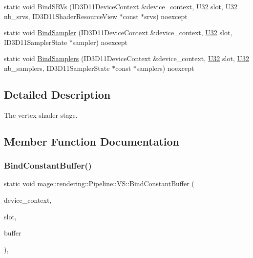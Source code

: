 \begin{DoxyCompactItemize}
\item 
static void \mbox{\hyperlink{structmage_1_1rendering_1_1_pipeline_1_1_v_s_a3285afafbc6c26d5677f010f793aa153}{Bind\+S\+R\+Vs}} (I\+D3\+D11\+Device\+Context \&device\+\_\+context, \mbox{\hyperlink{namespacemage_aa5d6eaabaac3cdd01873d6a3d27e90f3}{U32}} slot, \mbox{\hyperlink{namespacemage_aa5d6eaabaac3cdd01873d6a3d27e90f3}{U32}} nb\+\_\+srvs, I\+D3\+D11\+Shader\+Resource\+View $\ast$const $\ast$srvs) noexcept
\item 
static void \mbox{\hyperlink{structmage_1_1rendering_1_1_pipeline_1_1_v_s_a70bfab85f76020ee3562a470cd70f728}{Bind\+Sampler}} (I\+D3\+D11\+Device\+Context \&device\+\_\+context, \mbox{\hyperlink{namespacemage_aa5d6eaabaac3cdd01873d6a3d27e90f3}{U32}} slot, I\+D3\+D11\+Sampler\+State $\ast$sampler) noexcept
\item 
static void \mbox{\hyperlink{structmage_1_1rendering_1_1_pipeline_1_1_v_s_a154f65e40cf64e1b1f680aa1f8471142}{Bind\+Samplers}} (I\+D3\+D11\+Device\+Context \&device\+\_\+context, \mbox{\hyperlink{namespacemage_aa5d6eaabaac3cdd01873d6a3d27e90f3}{U32}} slot, \mbox{\hyperlink{namespacemage_aa5d6eaabaac3cdd01873d6a3d27e90f3}{U32}} nb\+\_\+samplers, I\+D3\+D11\+Sampler\+State $\ast$const $\ast$samplers) noexcept
\end{DoxyCompactItemize}


\subsection{Detailed Description}
The vertex shader stage. 

\subsection{Member Function Documentation}
\mbox{\label{structmage_1_1rendering_1_1_pipeline_1_1_v_s_a260784ea194b9e88cf6ec2de0ec5badd}} 
\subsubsection{\texorpdfstring{Bind\+Constant\+Buffer()}{BindConstantBuffer()}}
{\footnotesize\ttfamily static void mage\+::rendering\+::\+Pipeline\+::\+V\+S\+::\+Bind\+Constant\+Buffer (\begin{DoxyParamCaption}\item[{I\+D3\+D11\+Device\+Context \&}]{device\+\_\+context,  }\item[{\mbox{\hyperlink{namespacemage_aa5d6eaabaac3cdd01873d6a3d27e90f3}{U32}}}]{slot,  }\item[{I\+D3\+D11\+Buffer $\ast$}]{buffer }\end{DoxyParamCaption})\hspace{0.3cm}{\ttfamily [static]}, {\ttfamily [noexcept]}}

